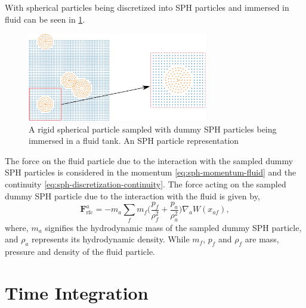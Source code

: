 \documentclass[preprint,12pt]{elsarticle}
\newcommand{\ten}[1]{\ensuremath{\mathbf{#1}}}
\begin{document}
With spherical particles being discretized into SPH particles and immersed in
fluid can be seen in \cref{fig:many_rb_in_fluid_sph_particles}.
\begin{figure}[!htpb]
  \centering
  \includegraphics[width=0.7\textwidth]{images/rfc_zoomed_combined}
  \caption{A rigid spherical particle sampled with dummy SPH particles being
    immersed in a fluid tank. An SPH particle representation}
  \label{fig:many_rb_in_fluid_sph_particles}
\end{figure}
The force on the fluid particle due to the
interaction with the sampled dummy SPH particles is considered in the momentum
\cref{eq:sph-momentum-fluid} and the continuity
\cref{eq:sph-discretization-continuity}. The force acting on the sampled dummy
SPH particle due to the interaction with the fluid is given by,
\begin{equation}
  \label{eq:rfc-force}
  \ten{F}_{\text{rfc}}^a = -m_a \sum_{f} m_f \bigg(\frac{p_f}{\rho_{f}^2} +
  \frac{p_a}{\rho_{a}^2}\bigg) \nabla_{a} W(x_{af}),
\end{equation}
where, $m_a$ signifies the hydrodynamic mass of the sampled dummy SPH particle,
and $\rho_a$ represents its hydrodynamic density. While $m_f$, $p_f$ and
$\rho_f$ are mass, pressure and density of the fluid particle.


\FloatBarrier%
\section{Time Integration}
\end{document}
